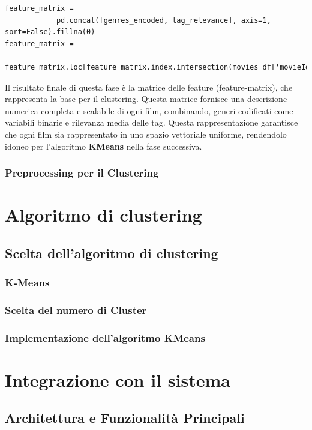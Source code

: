 \documentclass[a4paper,12pt]{article}
\begin{document}
\begin{enumerate}
\begin{verbatim}
feature_matrix = 
			pd.concat([genres_encoded, tag_relevance], axis=1, sort=False).fillna(0)
feature_matrix = 
			feature_matrix.loc[feature_matrix.index.intersection(movies_df['movieId'])]
\end{verbatim}
					Il risultato finale di questa fase è la matrice delle feature (feature-matrix), che rappresenta la base per il clustering. Questa matrice fornisce una descrizione numerica completa e scalabile di ogni film, combinando, generi codificati come variabili binarie e rilevanza media delle tag. Questa rappresentazione garantisce che ogni film sia rappresentato in uno spazio vettoriale uniforme, rendendolo idoneo per l'algoritmo \textbf{KMeans} nella fase successiva.

		\end{enumerate}

\subsubsection{Preprocessing per il Clustering}
\section{Algoritmo di clustering}
\subsection{Scelta dell’algoritmo di clustering}
\subsubsection{K-Means}
\subsubsection{Scelta del numero di Cluster}
\subsubsection{Implementazione dell'algoritmo KMeans}
\section{Integrazione con il sistema}
\subsection{Architettura e Funzionalità Principali}
\end{document}
